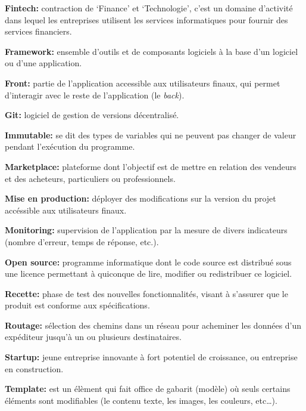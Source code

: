 \bigskip

\textbf{Fintech:} contraction de `Finance' et `Technologie', c'est un
domaine d'activité dans lequel les entreprises utilisent les services
informatiques pour fournir des services financiers.

\bigskip

\textbf{Framework:} ensemble d'outils et de composants logiciels à la
base d'un logiciel ou d'une application.

\bigskip

\textbf{Front:} partie de l'application accessible aux utilisateurs
finaux, qui permet d'interagir avec le reste de l'application (le
\emph{back}).

\bigskip

\textbf{Git:} logiciel de gestion de versions décentralisé.

\bigskip

\textbf{Immutable:} se dit des types de variables qui ne peuvent pas
changer de valeur pendant l'exécution du programme.

\bigskip

\textbf{Marketplace:} plateforme dont l'objectif est de mettre en
relation des vendeurs et des acheteurs, particuliers ou professionnels.

\bigskip

\textbf{Mise en production:} déployer des modifications sur la version
du projet accéssible aux utilisateurs finaux.

\bigskip

\textbf{Monitoring:} supervision de l'application par la mesure de
divers indicateurs (nombre d'erreur, temps de réponse, etc.).

\bigskip

\textbf{Open source:} programme informatique dont le code source est
distribué sous une licence permettant à quiconque de lire, modifier ou
redistribuer ce logiciel.

\bigskip

\textbf{Recette:} phase de test des nouvelles fonctionnalités, visant à
s'assurer que le produit est conforme aux spécifications.

\bigskip

\textbf{Routage:} sélection des chemins dans un réseau pour acheminer
les données d'un expéditeur jusqu'à un ou plusieurs destinataires.

\bigskip

\textbf{Startup:} jeune entreprise innovante à fort potentiel de
croissance, ou entreprise en construction.

\bigskip

\textbf{Template:} est un élèment qui fait office de gabarit (modèle) où
seuls certains éléments sont modifiables (le contenu texte, les images,
les couleurs, etc\ldots{}).
